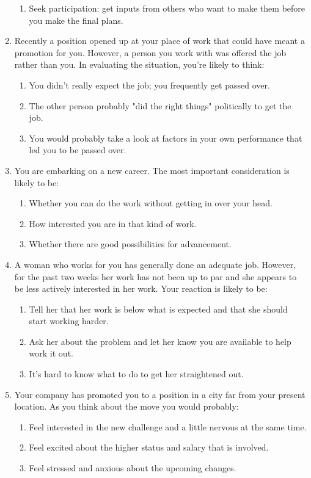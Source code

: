 \begin{enumerate}
\begin{enumerate}
        \item Seek participation: get inputs from others who want to make them before you make the final plans.
    \end{enumerate}
    \item Recently a position opened up at your place of work that could have meant a promotion for you. However, a person you work with was offered the job rather than you. In evaluating the situation, you're likely to think:
    \begin{enumerate}
        \item You didn't really expect the job; you frequently get passed over.
        \item The other person probably "did the right things" politically to get the job.
        \item You would probably take a look at factors in your own performance that led you to be passed over.
    \end{enumerate}
    \item You are embarking on a new career. The most important consideration is likely to be:
    \begin{enumerate}
        \item Whether you can do the work without getting in over your head.
        \item How interested you are in that kind of work.
        \item Whether there are good possibilities for advancement.
    \end{enumerate}
    \item A woman who works for you has generally done an adequate job. However, for the past two weeks her work has not been up to par and she appears to be less actively interested in her work. Your reaction is likely to be:
    \begin{enumerate}
        \item Tell her that her work is below what is expected and that she should start working harder.
        \item Ask her about the problem and let her know you are available to help work it out.
        \item It's hard to know what to do to get her straightened out.
    \end{enumerate}
    \item Your company has promoted you to a position in a city far from your present location. As you think about the move you would probably:
    \begin{enumerate}
        \item Feel interested in the new challenge and a little nervous at the same time.
        \item Feel excited about the higher status and salary that is involved.
        \item Feel stressed and anxious about the upcoming changes.
    \end{enumerate}
\end{enumerate}

